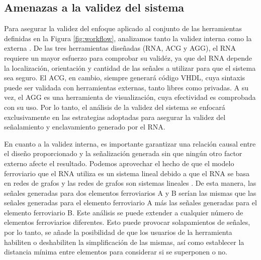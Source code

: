 \subsection{Amenazas a la validez del sistema}
    \label{sec:validacion}
    Para asegurar la validez del enfoque aplicado al conjunto de las herramientas definidas en la Figura \ref{fig:workflow}, analizamos tanto la validez interna como la externa \cite{Paper_139,Paper_121,Paper_185}. De las tres herramientas diseñadas (RNA, ACG y AGG), el RNA requiere un mayor esfuerzo para comprobar su validéz, ya que del RNA depende la localización, orientación y cantidad de las señales a utilizar para que el sistema sea seguro. El ACG, en cambio, siempre generará código VHDL, cuya sintaxis puede ser validada con herramientas externas, tanto libres como privadas. A su vez, el AGG es una herramienta de visualización, cuya efectividad es comprobada con su uso. Por lo tanto, el análisis de la validez del sistema se enfocará exclusivamente en las estrategias adoptadas para asegurar la validez del señalamiento y enclavamiento generado por el RNA.    
    
    En cuanto a la validez interna, es importante garantizar una relación causal entre el diseño proporcionado y la señalización generada sin que ningún otro factor externo afecte el resultado. Podemos aprovechar el hecho de que el modelo ferroviario que el RNA utiliza es un sistema lineal debido a que el RNA se basa en redes de grafos \cite{Paper_109,Paper_112,Paper_149,Paper_150,Paper_201} y las redes de grafos son sistemas lineales \cite{Paper_19,Paper_86,Paper_89,Paper_101,Paper_102,Paper_114,Paper_115,Paper_141,Paper_142,Paper_144,Paper_146,Paper_151,Paper_154,Paper_155,Paper_162,Paper_163,Paper_169,Paper_171,Paper_180}. De esta manera, las señales generadas para dos elementos ferroviarios A y B serían las mismas que las señales generadas para el elemento ferroviario A más las señales generadas para el elemento ferroviario B. Este análisis se puede extender a cualquier número de elementos ferroviarios diferentes. Esto puede provocar solapamientos de señales, por lo tanto, se añade la posibilidad de que los usuarios de la herramienta habiliten o deshabiliten la simplificación de las mismas, así como establecer la distancia mínima entre elementos para considerar si se superponen o no.


